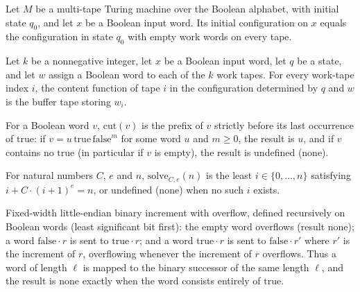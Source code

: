 \begin{lemma}
\label{Turing.initCfg_ofWords}
\leanok
{}
Let $M$ be a multi-tape Turing machine over the Boolean alphabet, with initial state
$q_0$, and let $x$ be a Boolean input word. Its initial configuration on $x$ equals the
configuration in state $q_0$ with empty work words on every tape.
\end{lemma}

\begin{lemma}
\label{Turing.Cfg.ofWords_workTapes}
\leanok
{}
Let $k$ be a nonnegative integer, let $x$ be a Boolean input word, let $q$ be a state,
and let $w$ assign a Boolean word to each of the $k$ work tapes. For every work-tape
index $i$, the content function of tape $i$ in the configuration determined by $q$ and
$w$ is the buffer tape storing $w_i$.
\end{lemma}

\begin{definition}
\label{Turing.splitAtLastTrue}
\leanok
For a Boolean word $v$, $\mathrm{cut}(v)$ is the prefix of $v$ strictly
before its last occurrence of $\mathrm{true}$: if $v = u \, \mathrm{true} \,
\mathrm{false}^m$ for some word $u$ and $m \ge 0$, the result is $u$, and if $v$
contains no $\mathrm{true}$ (in particular if $v$ is empty), the result is undefined
(none).
\end{definition}

\begin{definition}
\label{Turing.solveSplit}
\leanok
For natural numbers $C$, $e$ and $n$, $\mathrm{solve}_{C,e}(n)$ is the least
$i \in \{0, \dots, n\}$ satisfying $i + C \cdot (i+1)^e = n$, or undefined (none) when
no such $i$ exists.
\end{definition}

\begin{definition}
\label{Turing.incFixed}
\leanok
Fixed-width little-endian binary increment with overflow, defined recursively on Boolean
words (least significant bit first): the empty word overflows (result none); a word
$\mathrm{false} \cdot r$ is sent to $\mathrm{true} \cdot r$; and a word
$\mathrm{true} \cdot r$ is sent to $\mathrm{false} \cdot r'$ where $r'$ is the
increment of $r$, overflowing whenever the increment of $r$ overflows. Thus a word of
length $\ell$ is mapped to the binary successor of the same length $\ell$, and the
result is none exactly when the word consists entirely of $\mathrm{true}$.
\end{definition}

